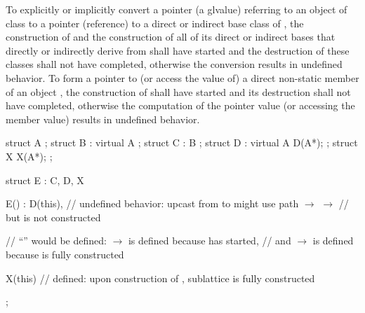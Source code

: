 \pnum
{}%
%
To explicitly or implicitly convert a pointer (a glvalue) referring to
an object of class
to a pointer (reference) to a direct or indirect base class
of
,
the construction of
and the construction of all of its direct or indirect bases that directly or
indirectly derive from
shall have started and the destruction of these classes shall not have
completed, otherwise the conversion results in undefined behavior.
To form a pointer to (or access the value of) a direct non-static member of
an object
,
the construction of
shall have started and its destruction shall not have completed,
otherwise the computation of the pointer value (or accessing the member
value) results in undefined behavior.
\begin{example}
\begin{codeblock}
struct A { };
struct B : virtual A { };
struct C : B { };
struct D : virtual A { D(A*); };
struct X { X(A*); };

struct E : C, D, X {
  E() : D(this),    // undefined behavior: upcast from  to  might use path  $\rightarrow$  $\rightarrow$ 
                    // but  is not constructed

                    // ``\!'' would be defined:  $\rightarrow$  is defined because  has started,
                    // and  $\rightarrow$  is defined because  is fully constructed

  X(this) {}        // defined: upon construction of ,  sublattice is fully constructed
};
\end{codeblock}
\end{example}

